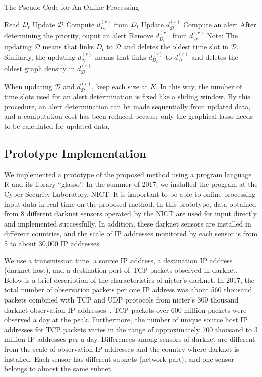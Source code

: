 \documentclass{sig-alternate-10pt}
\begin{document}
\begin{algorithm}[h]                   
\caption{The Pseudo Code for An Online Processing}
\label{alg1}
\begin{algorithmic}
	\STATE Read $D_t$
	\STATE Update $\mathcal{D}$
		\STATE Compute $d_{D_t}^{(r)}$ from $D_t$
		\STATE Update $d_{\mathcal{D}}^{(r)}$
		\STATE Compute an alert
		\vspace*{0.1cm}
			\vspace*{0.1cm}
			\STATE After determining the priority, ouput an alert
			\STATE Remove $d_{D_t}^{(r)}$ from $d_{\mathcal{D}}^{(r)}$
		\ENDIF
	\ENDFOR
\ENDFOR
\STATE Note: The updating $\mathcal{D}$ means that links $D_t$ to $\mathcal{D}$ and deletes the oldest time slot in $\mathcal{D}$.
Similarly, the updating $d_{\mathcal{D}}^{(r)}$ means that links $d_{D_t}^{(r)}$ to $d_{\mathcal{D}}^{(r)}$ and deletes the oldest graph density in $d_{\mathcal{D}}^{(r)}$.
\end{algorithmic}
\end{algorithm}

When updating $\mathcal{D}$ and $d_{\mathcal{D}}^{(r)}$, keep each size at $K$.
In this way, the number of time slots used for an alert determination is fixed like a sliding window.
By this procedure, an alert determination can be made sequentially from updated data, and a computation cost has been reduced because only the graphical lasso needs to be calculated for updated data.

\subsection{Prototype Implementation}
We implemented a prototype of the proposed method using a program language R and its library ``glasso''.
In the summer of 2017, we installed the program at the Cyber ​​Security Laboratory, NICT.
It is important to be able to online-processing input data in real-time on the proposed method.
In this prototype, data obtained from 8 different darknet sensors operated by the NICT are used for input directly and implemented successfully.
In addition, these darknet sensors are installed in different countries, and the scale of IP addresses monitored by each sensor is from 5 to about 30,000 IP addresses.

We use a transmission time, a source IP address, a destination IP address (darknet host), and a destination port of TCP packets observed in darknet.
Below is a brief description of the characteristics of nicter's darknet.
In 2017, the total number of observation packets per one IP address was about 560 thousand packets combined with TCP and UDP protocols from nicter's 300 thousand darknet observation IP addresses~\cite{NICTER2017}.
TCP packets over 600 million packets were observed a day at the peak.
Furthermore, the number of unique source host IP addresses for TCP packets varies in the range of approximately 700 thousand to 3 million IP addresses per a day.
Differences among sensors of darknet are different from the scale of observation IP addresses and the country where darknet is installed.
Each sensor has different subnets (network part), and one sensor belongs to almost the same subnet.
\end{document}
